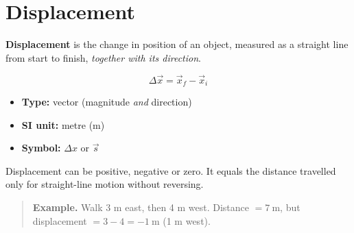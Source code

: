 
\section*{Displacement}

\textbf{Displacement} is the change in position of an object, measured as
a straight line from start to finish, \emph{together with its direction}.

\begin{equation}
  \Delta \vec{x} = \vec{x}_{f} - \vec{x}_{i}
\end{equation}

\begin{itemize}
  \item \textbf{Type:} vector (magnitude \emph{and} direction)
  \item \textbf{SI unit:} metre (m)
  \item \textbf{Symbol:} $\Delta x$ or $\vec{s}$
\end{itemize}

Displacement can be positive, negative or zero. It equals the distance
travelled only for straight-line motion without reversing.

\begin{quote}
\textbf{Example.} Walk 3 m east, then 4 m west. Distance $= 7\ \text{m}$,
but displacement $= 3 - 4 = -1\ \text{m}$ (1 m west).
\end{quote}
